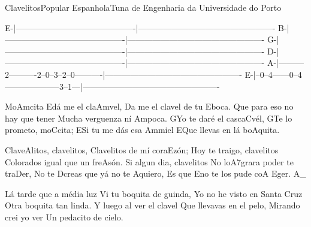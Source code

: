 \begin{musica}{Clavelitos}{Popular Espanhola}{Tuna de Engenharia da Universidade do Porto}
\begin{tablatura}
E-|-------------------------------------------|-------------------------------------------------
B-|-------------------------------------------|-------------------------------------------------
G-|-------------------------------------------|-------------------------------------------------
D-|-------------------------------------------|-------------------------------------------------
A-|---------2----------2--0--3--2--0----------|-------------------------------------------------
E-|--0--4------0--4--------------------3--1---|-------------------------------------------------
\end{tablatura}

Mo\ac{Am}{ci}ta \ac{E}{dá} me el cla\ac{Am}{vel},
Da me el clavel de tu \ac{E}{bo}ca.
Que para eso no hay que tener
Mucha verguenza ní \ac{Am}{po}ca.
\ac{G}{Yo} te daré el casca\ac{C}{vél},
\ac{G}{Te} lo prometo, mo\ac{C}{ci}ta;
\ac{E}{Si} tu me dás esa \ac{Am}{mi}el
\ac{E}{Que} llevas en lá bo\ac{A}{qui}ta.

Clave\ac{A}{li}tos, clavelitos,
Clavelitos de mí cora\ac{E}{zón};
Hoy te traigo, clavelitos
Colorados igual que un fre\ac{A}{són}.
Si algun dia, clavelitos
No lo\ac{A7}{gra}ra poder te tra\ac{D}{er},
No te \ac{D}{creas} que yá no te \ac{A}{qui}ero,
Es que \ac{E}{no} te los pude co\ac{A E}{ger}. \ac{A}{}_

Lá tarde que a média luz
Vi tu boquita de guinda,
Yo no he visto en Santa Cruz
Otra boquita tan linda.
Y luego al ver el clavel
Que llevavas en el pelo,
Mirando crei yo ver
Un pedacito de cielo.


\end{musica}
